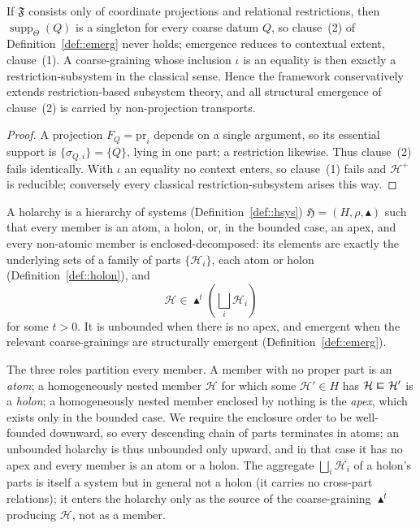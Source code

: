 \documentclass[runningheads]{llncs}
\makeatletter
\newcommand\sqin{\mathrel{\raisebox{0.1ex}{\ooalign{$\sqsubset$\cr $-$}}}}
\newcommand{\superimpose}[2]{{\ooalign{$#1\@firstoftwo#2$\cr\hfil$#1\@secondoftwo#2$\hfil\cr}}}
\newcommand{\encloses}{\mathrel{\mathpalette\superimpose{{\sqsubset}{\hfil{\raisebox{0.09ex}{\scalebox{0.85}[0.7]{$\sqin$}}}}}}}
\newcommand{\encl}{\mathrel{\raisebox{0.1ex}{$\encloses$}}}
\newcommand{\supp}{\operatorname{supp}}
\makeatother
\begin{document}
\begin{proposition}\label{prop::recover}
If $\mathfrak F$ consists only of coordinate projections and relational restrictions, then $\supp_\Theta(Q)$ is a singleton for every coarse datum $Q$, so clause~(2) of Definition~\ref{def::emerg} never holds; emergence reduces to contextual extent, clause~(1). A coarse-graining whose inclusion $\iota$ is an equality is then exactly a restriction-subsystem in the classical sense. Hence the framework conservatively extends restriction-based subsystem theory, and all structural emergence of clause~(2) is carried by non-projection transports.
\end{proposition}
\begin{proof}
A projection $F_Q=\mathrm{pr}_i$ depends on a single argument, so its essential support is $\{\sigma_{Q,i}\}=\{Q\}$, lying in one part; a restriction likewise. Thus clause~(2) fails identically. With $\iota$ an equality no context enters, so clause~(1) fails and $\mathcal H^+$ is reducible; conversely every classical restriction-subsystem arises this way.
\end{proof}

\begin{definition}[Holarchy]\label{def::holarchy}
A holarchy is a hierarchy of systems (Definition~\ref{def::hsys}) $\mathfrak H=(H,\rho,\blacktriangle)$ such that every member is an atom, a holon, or, in the bounded case, an apex, and every non-atomic member is enclosed-decomposed: its elements are exactly the underlying sets of a family of parts $\{\mathcal H_i\}$, each atom or holon (Definition~\ref{def::holon}), and
\[
\mathcal H\in\blacktriangle^t\left(\bigsqcup_i\mathcal H_i\right)
\]
for some $t>0$. It is unbounded when there is no apex, and emergent when the relevant coarse-grainings are structurally emergent (Definition~\ref{def::emerg}).
\end{definition}

\noindent The three roles partition every member. A member with no proper part is an \emph{atom}; a homogeneously nested member $\mathcal H$ for which some $\mathcal H'\in H$ has $\mathcal H\encl\mathcal H'$ is a \emph{holon}; a homogeneously nested member enclosed by nothing is the \emph{apex}, which exists only in the bounded case. We require the enclosure order to be well-founded downward, so every descending chain of parts terminates in atoms; an unbounded holarchy is thus unbounded only upward, and in that case it has no apex and every member is an atom or a holon. The aggregate $\bigsqcup_i\mathcal H_i$ of a holon's parts is itself a system but in general not a holon (it carries no cross-part relations); it enters the holarchy only as the source of the coarse-graining $\blacktriangle^t$ producing $\mathcal H$, not as a member.
\end{document}
